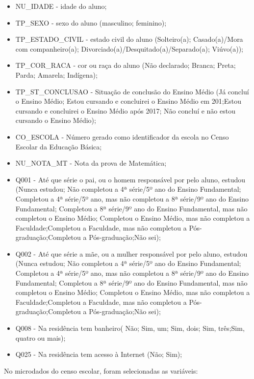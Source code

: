 \begin{itemize}
	\item NU\_IDADE - idade do aluno;
	\item TP\_SEXO - sexo do aluno (masculino; feminino);
	\item TP\_ESTADO\_CIVIL - estado civil do aluno (Solteiro(a); Casado(a)/Mora com companheiro(a); Divorciado(a)/Desquitado(a)/Separado(a);  Viúvo(a));
	\item TP\_COR\_RACA - cor ou raça do aluno (Não declarado; Branca; Preta; Parda; Amarela; Indígena);
	\item TP\_ST\_CONCLUSAO - Situação de conclusão do Ensino Médio (Já concluí o Ensino Médio; Estou cursando e concluirei o Ensino Médio em 201;Estou cursando e concluirei o Ensino Médio após 2017; Não concluí e não estou cursando o Ensino Médio);
	\item CO\_ESCOLA -  Número gerado como identificador da escola no Censo Escolar da Educação Básica;
	\item NU\_NOTA\_MT - Nota da prova de Matemática;
	\item Q001 - Até que série o pai, ou o homem responsável por pelo aluno, estudou (Nunca estudou; Não completou a 4ª série/5º ano do Ensino Fundamental; Completou a 4ª série/5º ano, mas não completou a 8ª série/9º ano do Ensino Fundamental; Completou a 8ª série/9º ano do Ensino Fundamental, mas não completou o Ensino Médio; Completou o Ensino Médio, mas não completou a Faculdade;Completou a Faculdade, mas não completou a Pós-graduação;Completou a Pós-graduação;Não sei);
	\item Q002 - Até que série a mãe, ou a mulher responsável por pelo aluno, estudou (Nunca estudou; Não completou a 4ª série/5º ano do Ensino Fundamental; Completou a 4ª série/5º ano, mas não completou a 8ª série/9º ano do Ensino Fundamental; Completou a 8ª série/9º ano do Ensino Fundamental, mas não completou o Ensino Médio; Completou o Ensino Médio, mas não completou a Faculdade;Completou a Faculdade, mas não completou a Pós-graduação;Completou a Pós-graduação;Não sei);
	\item Q008 - Na residência tem banheiro( Não; Sim, um; Sim, dois; Sim, três;Sim, quatro ou mais);
	\item Q025 - Na residência tem acesso à Internet (Não; Sim);
\end{itemize}
No microdados do censo escolar, foram selecionadas as variáveis:
